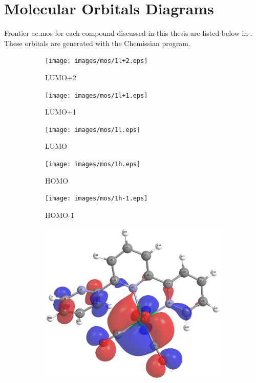 \chapter{Molecular Orbitals Diagrams} \label{app.mos}

Frontier \glspl{ac.mo} for each compound discussed in this thesis are listed below in . These orbitals are generated with the Chemissian program\autocite{chemissian}.

\begin{figure}[!ht]
 \centering
 \begin{subfigure}[b]{0.31\textwidth}
  \texttt{[image: images/mos/1l+2.eps]}
  \caption{LUMO+2}
 \end{subfigure}
  \begin{subfigure}[b]{0.31\textwidth}
  \texttt{[image: images/mos/1l+1.eps]}
  \caption{LUMO+1}
 \end{subfigure}
  \begin{subfigure}[b]{0.31\textwidth}
  \texttt{[image: images/mos/1l.eps]}
  \caption{LUMO}
 \end{subfigure}
 \begin{subfigure}[b]{0.31\textwidth}
  \texttt{[image: images/mos/1h.eps]}
  \caption{HOMO}
 \end{subfigure}
 \begin{subfigure}[b]{0.31\textwidth}
  \texttt{[image: images/mos/1h-1.eps]}
  \caption{HOMO-1}
 \end{subfigure}
 \begin{subfigure}[b]{0.31\textwidth}
  \includegraphics[clip=true, width=\textwidth, keepaspectratio]{images/mos/1h-2.eps}

\end{subfigure}
\end{figure}
